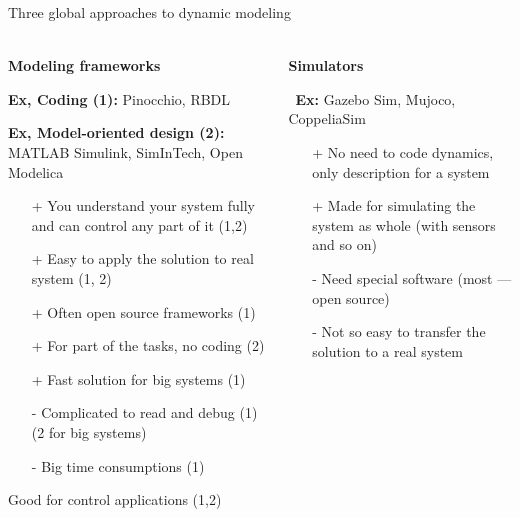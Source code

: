 \documentclass[aspectratio=169]{beamer}
\begin{document}
\begin{frame}[t]{Three global approaches to dynamic modeling}
\framesubtitle{}
\scriptsize
\vspace{-0.8cm}
    \begin{columns}[T,onlytextwidth]
        \begin{column}{0.33\textwidth}
            \begin{center}
                \textbf{Modeling frameworks}
            \end{center}
            \vspace{-0.3cm}
            \textbf{Ex, Coding (1):} Pinocchio, RBDL

            \textbf{Ex, Model-oriented design (2):} MATLAB Simulink, SimInTech, Open Modelica
            \begin{itemize}
                \item[+] You understand your system fully and can control any part of it (1,2)
                \item[+] Easy to apply the solution to real system (1, 2)
                \item[+] Often open source frameworks (1)
                \item[+] For part of the tasks, no coding (2)
                \item[+] Fast solution for big systems (1)
                \item[-] Complicated to read and debug (1) (2 for big systems)
                \item[-] Big time consumptions (1)
            \end{itemize}
            \alert{Good for control applications (1,2)}
        \end{column}
        \begin{column}{0.33\textwidth}
            \begin{center}
                \textbf{Simulators}
            \end{center}
            \vspace{-0.3cm}
            \ \textbf{Ex:} Gazebo Sim, Mujoco, CoppeliaSim
            \begin{itemize}
                \item[+] No need to code dynamics, only description for a system
                \item[+] Made for simulating the system as whole (with sensors and so on) 
                \item[-] Need special software (most --- open source)
                \item[-] Not so easy to transfer the solution to a real system 

\end{itemize}
\end{column}
\end{columns}
\end{frame}
\end{document}
